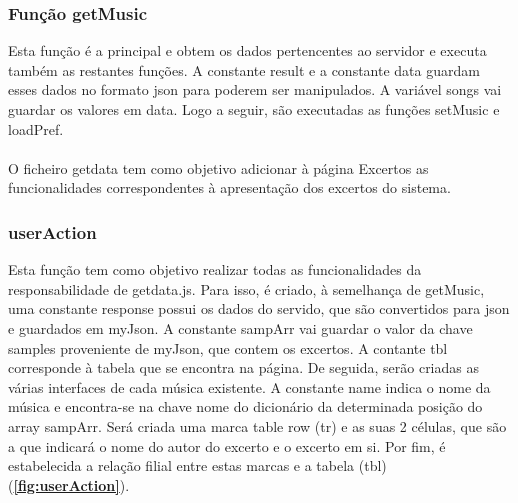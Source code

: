 \documentclass{report}
\begin{document}
\subsubsection{Função getMusic}
\label{ssec:getMusic}
\hspace{5pt}Esta função é a principal e obtem os dados pertencentes ao servidor e executa também as 
restantes funções. A constante result e a constante data guardam esses dados no formato \ac{json} para 
poderem ser manipulados. A variável songs vai guardar os valores em data. Logo a seguir, são executadas 
as funções setMusic e loadPref.

\paragraph{}

\hspace{5pt}O ficheiro getdata tem como objetivo adicionar à página Excertos as funcionalidades 
correspondentes à apresentação dos excertos do sistema.

\subsubsection{userAction}
\label{ssec:userAction}
\hspace{5pt}Esta função tem como objetivo realizar todas as funcionalidades da responsabilidade de 
getdata.js. Para isso, é criado, à semelhança de getMusic, uma constante response possui os dados 
do servido, que são convertidos para \ac{json} e guardados em myJson. A constante sampArr vai 
guardar o valor da chave samples proveniente de myJson, que contem os excertos. A contante tbl 
corresponde à tabela que se encontra na página. De seguida, serão criadas as várias interfaces de cada 
música existente. A constante name indica o nome da música e encontra-se na chave nome do dicionário da 
determinada posição do array sampArr. Será criada uma marca table row (tr) e as suas 2 células, que são a 
que indicará o nome do autor do excerto e o excerto em si. Por fim, é estabelecida a relação filial entre 
estas marcas e a tabela (tbl) (\textbf{\autoref{fig:userAction}}).
\end{document}
